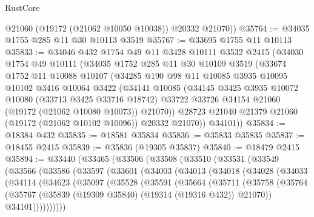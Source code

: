 \begin{lexlean}{RustCore}
\begin{coremodule}
        @21060
        (@19172 (@21062 @10050 @10038))
        @20332
        @21070))
@35764 := @34035 @1755 @285 @11 @30 @10113 @3519
@35767 := @33695 @1755 @11 @10113
@35833 := @34046
    @432
    @1754
    @49
    @11
    @3428
    @10111
    @3532
    @2415
    (@34030
      @1754
      @49
      @10111
      (@34035
        @1752
        @285
        @11
        @30
        @10109
        @3519
        (@33674
          @1752
          @11
          @10088
          @10107
          (@34285
            @190
            @98
            @11
            @10085
            @3935
            @10095
            @10102
            @3416
            @10064
            @3422
            (@34141
              @10085
              (@34145
                @3425
                @3935
                @10072
                @10080
                (@33713 @3425 @33716 @18742)
                @33722
                @33726
                @34154
                @21060
                (@19172 (@21062 @10080 @10073))
                @21070))
            @28723
            @21040
            @21379
            @21060
            (@19172 (@21062 @10102 @10096))
            @20332
            @21070))
        @34101))
@35834 := @18384 @432
@35835 := @18581 @35834
@35836 := @35833 @35835
@35837 := @18455 @2415
@35839 := @35836 (@19305 @35837)
@35840 := @18479 @2415
@35894 := @33440
    (@33465
      (@33506
        (@33508
          (@33510
            (@33531
              (@33549
                (@33566
                  (@33586
                    (@33597
                      (@33601
                        (@34003
                          (@34013
                            (@34018
                              (@34028
                                (@34033
                                  (@34114
                                    (@34623
                                      (@35097
                                        (@35528
                                          (@35591
                                            (@35664
                                              (@35711
                                                (@35758
                                                  (@35764
                                                    (@35767
                                                      (@35839
                                                        (@19309 @35840)
                                                        (@19314 (@19316 @432))
                                                        @21070))
                                                    @34101))))))))))

\end{coremodule}
\end{lexlean}
